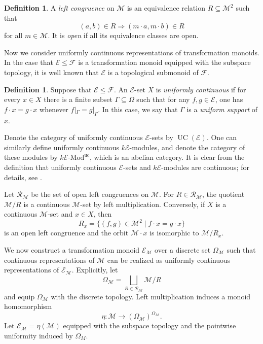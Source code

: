 \documentclass[10pt, reqno]{amsart}
\theoremstyle{plain}
\numberwithin{equation}{section}
\theoremstyle{definition}
\newtheorem{definition}[theorem]{Definition}
\newcommand{\Mod}{{\textrm{-}\mathrm{Mod}}}
\newcommand{\UC}{\operatorname{UC}}
\newcommand{\M}{\mathscr M}
\newcommand{\E}{\mathscr E}
\newcommand{\Rcal}{\mathcal R}
\begin{document}
\begin{definition}
A \emph{left congruence} on $\M$ is an equivalence relation $R \subseteq \M^2$ such that
\[
(a,b) \in R \Longrightarrow (m \cdot a, m \cdot b) \in R
\]
for all $m \in \M$. It is \emph{open} if all its equivalence classes are open.
\end{definition}

Now we consider uniformly continuous representations of transformation monoids. In the case that $\E \leqslant \mathscr{F}$ is a transformation monoid equipped with the subspace topology, it is well known that $\E$ is a topological submonoid of $\mathscr{F}$.

\begin{definition}
Suppose that $\E \leqslant \mathscr{F}$. An $\E$-set $X$ is \emph{uniformly continuous} if for every $x \in X$ there is a finite subset $\Gamma \subseteq \Omega$ such that for any $f, g \in \E$, one has $f \cdot x = g \cdot x$ whenever $f|_{\Gamma} = g|_{\Gamma}$. In this case, we say that $\Gamma$ is a \emph{uniform support} of $x$.
\end{definition}

Denote the category of uniformly continuous $\E$-sets by $\UC(\E)$. One can similarly define uniformly continuous $k\E$-modules, and denote the category of these modules by $k\E \Mod^{\mathrm{uc}}$, which is an abelian category. It is clear from the definition that uniformly continuous $\E$-sets and $k\E$-modules are continuous; for details, see \cite{LiRel}.

Let $\Rcal_\M$ be the set of open left congruences on $\M$. For $R \in \Rcal_\M$, the quotient $\M/R$ is a continuous $\M$-set by left multiplication. Conversely, if $X$ is a continuous $\M$-set and $x \in X$, then
\[
R_x = \{(f, g) \in \M^2 \mid f \cdot x = g \cdot x \}
\]
is an open left congruence and the orbit $\M \cdot x$ is isomorphic to $\M/R_x$.

We now construct a transformation monoid $\E_\M$ over a discrete set $\Omega_{\M}$ such that continuous representations of $\M$ can be realized as uniformly continuous representations of $\E_\M$. Explicitly, let
\begin{equation}\label{eq:OmegaM}
\Omega_{\M} =\bigsqcup_{R \in \Rcal_\M} \M/R
\end{equation}
and equip $\Omega_\M$ with the discrete topology. Left multiplication induces a monoid homomorphism
\[
\eta: \M \to (\Omega_\M)^{\Omega_\M}.
\]
Let $\E_\M = \eta(\M)$ equipped with the subspace topology and the pointwise uniformity induced by $\Omega_M$.
\end{document}
